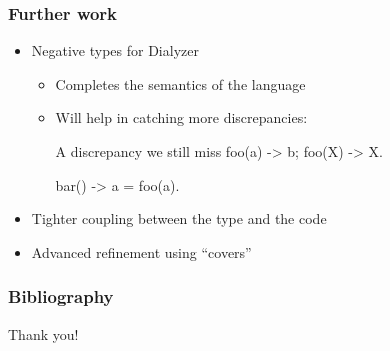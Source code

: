 \documentclass{beamer}
\begin{document}
\begin{frame}[fragile]
  \frametitle{Further work}
  \begin{itemize}
  \item Negative types for Dialyzer
    \begin{itemize}
    \item Completes the semantics of the language
    \item Will help in catching more discrepancies:
\begin{code}{A discrepancy we still miss}
foo(a) -> b;
foo(X) -> X.

bar() ->
    a = foo(a).
\end{code}
    \end{itemize} \pause
  \item Tighter coupling between the type and the code \pause
  \item Advanced refinement using ``covers''
  \end{itemize}
\end{frame}

\begin{frame}
  \frametitle{Bibliography}
  
  
\end{frame}

\begin{frame}
  \begin{center}
    Thank you!
  \end{center}
\end{frame}
\end{document}
